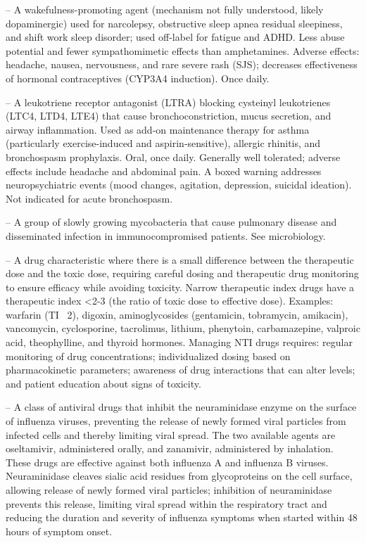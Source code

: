 -- A wakefulness-promoting agent (mechanism not fully understood, likely dopaminergic) used for narcolepsy, obstructive sleep apnea residual sleepiness, and shift work sleep disorder; used off-label for fatigue and ADHD. Less abuse potential and fewer sympathomimetic effects than amphetamines. Adverse effects: headache, nausea, nervousness, and rare severe rash (SJS); decreases effectiveness of hormonal contraceptives (CYP3A4 induction). Once daily.

-- A leukotriene receptor antagonist (LTRA) blocking cysteinyl leukotrienes (LTC4, LTD4, LTE4) that cause bronchoconstriction, mucus secretion, and airway inflammation. Used as add-on maintenance therapy for asthma (particularly exercise-induced and aspirin-sensitive), allergic rhinitis, and bronchospasm prophylaxis. Oral, once daily. Generally well tolerated; adverse effects include headache and abdominal pain. A boxed warning addresses neuropsychiatric events (mood changes, agitation, depression, suicidal ideation). Not indicated for acute bronchospasm.

-- A group of slowly growing mycobacteria that cause pulmonary disease and disseminated infection in immunocompromised patients. See microbiology.

-- A drug characteristic where there is a small difference between the therapeutic dose and the toxic dose, requiring careful dosing and therapeutic drug monitoring to ensure efficacy while avoiding toxicity. Narrow therapeutic index drugs have a therapeutic index <2-3 (the ratio of toxic dose to effective dose). Examples: warfarin (TI ~2), digoxin, aminoglycosides (gentamicin, tobramycin, amikacin), vancomycin, cyclosporine, tacrolimus, lithium, phenytoin, carbamazepine, valproic acid, theophylline, and thyroid hormones. Managing NTI drugs requires: regular monitoring of drug concentrations; individualized dosing based on pharmacokinetic parameters; awareness of drug interactions that can alter levels; and patient education about signs of toxicity.

-- A class of antiviral drugs that inhibit the neuraminidase enzyme on the surface of influenza viruses, preventing the release of newly formed viral particles from infected cells and thereby limiting viral spread. The two available agents are oseltamivir, administered orally, and zanamivir, administered by inhalation. These drugs are effective against both influenza A and influenza B viruses. Neuraminidase cleaves sialic acid residues from glycoproteins on the cell surface, allowing release of newly formed viral particles; inhibition of neuraminidase prevents this release, limiting viral spread within the respiratory tract and reducing the duration and severity of influenza symptoms when started within 48 hours of symptom onset.

